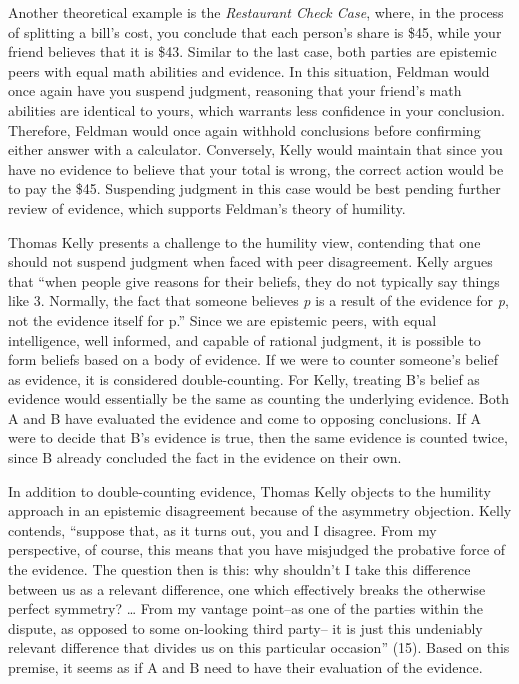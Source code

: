 Another theoretical example is the \emph{Restaurant Check Case}, where, in the process of splitting a bill’s cost, you conclude that each person’s share is \$45, while your friend believes that it is \$43. Similar to the last case, both parties are epistemic peers with equal math abilities and evidence. In this situation, Feldman would once again have you suspend judgment, reasoning that your friend’s math abilities are identical to yours, which warrants less confidence in your conclusion. Therefore, Feldman would once again withhold conclusions before confirming either answer with a calculator. Conversely, Kelly would maintain that since you have no evidence to believe that your total is wrong, the correct action would be to pay the \$45. Suspending judgment in this case would be best pending further review of evidence, which supports Feldman’s theory of humility. 

Thomas Kelly presents a challenge to the humility view, contending that one should not suspend judgment when faced with peer disagreement. Kelly argues that “when people give reasons for their beliefs, they do not typically say things like 3. Normally, the fact that someone believes \emph{p} is a result of the evidence for \emph{p}, not the evidence itself for p.” Since we are epistemic peers, with equal intelligence, well informed, and capable of rational judgment, it is possible to form beliefs based on a body of evidence. If we were to counter someone’s belief as evidence, it is considered double-counting. For Kelly, treating B’s belief as evidence would essentially be the same as counting the underlying evidence. Both A and B have evaluated the evidence and come to opposing conclusions. If A were to decide that B’s evidence is true, then the same evidence is counted twice, since B already concluded the fact in the evidence on their own.

In addition to double-counting evidence, Thomas Kelly objects to the humility approach in an epistemic disagreement because of the asymmetry objection. Kelly contends, “suppose that, as it turns out, you and I disagree. From my perspective, of course, this means that you have misjudged the probative force of the evidence. The question then is this: why shouldn’t I take this difference between us as a relevant difference, one which effectively breaks the otherwise perfect symmetry? … From my vantage point–as one of the parties within the dispute, as opposed to some on-looking third party– it is just this undeniably relevant difference that divides us on this particular occasion” (15). Based on this premise, it seems as if A and B need to have their evaluation of the evidence. 


